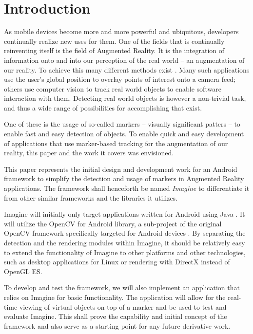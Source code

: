 \section{Introduction}

As mobile devices become more and more powerful and ubiquitous, developers continually realize new uses for them.
One of the fields that is continually reinventing itself is the field of Augmented Reality.
It is the integration of information onto and into our perception of the real world – an augmentation of our reality.
To achieve this many different methods exist \cite{sabrina972}.
Many such applications use the user's global position to overlay points of interest onto a camera feed; others use computer vision to track real world objects to enable software interaction with them.
Detecting real world objects is however a non-trivial task, and thus a wide range of possibilities for accomplishing that exist.

One of these is the usage of so-called markers – visually significant patters – to enable fast and easy detection of objects.
To enable quick and easy development of applications that use marker-based tracking for the augmentation of our reality, this paper and the work it covers was envisioned.

This paper represents the initial design and development work for an Android framework to simplify the detection and usage of markers in Augmented Reality applications.
The framework shall henceforth be named \textit{Imagine} to differentiate it from other similar frameworks and the libraries it utilizes.

Imagine will initially only target applications written for Android using Java \cite{android}.
It will utilize the OpenCV for Android library, a sub-project of the original OpenCV framework specifically targeted for Android devices \cite{opencvandroid}.
By separating the detection and the rendering modules within Imagine, it should be relatively easy to extend the functionality of Imagine to other platforms and other technologies, such as desktop applications for Linux or rendering with DirectX instead of OpenGL ES.

To develop and test the framework, we will also implement an application that relies on Imagine for basic functionality.
The application will allow for the real-time viewing of virtual objects on top of a marker and be used to test and evaluate Imagine.
This shall prove the capability and initial concept of the framework and also serve as a starting point for any future derivative work.

